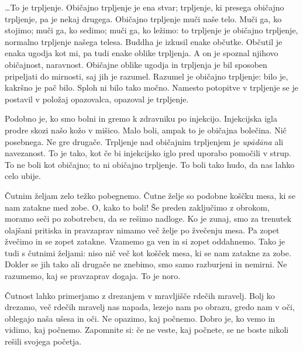 \clearpage


\ldots{}To je trpljenje. Običajno trpljenje je ena stvar; trpljenje, ki presega običajno trpljenje, pa je nekaj drugega. Običajno trpljenje muči naše telo. Muči ga, ko stojimo; muči ga, ko sedimo; muči ga, ko ležimo: to trpljenje je običajno trpljenje, normalno trpljenje našega telesa. Buddha je izkusil enake občutke. Občutil je enaka ugodja kot mi, pa tudi enake oblike trpljenja. A on je spoznal njihovo običajnost, naravnost. Običajne oblike ugodja in trpljenja je bil sposoben pripeljati do mirnosti, saj jih je razumel. Razumel je običajno trpljenje: bilo je, kakršno je pač bilo. Sploh ni bilo tako močno. Namesto potopitve v trpljenje se je postavil v položaj opazovalca, opazoval je trpljenje.

Podobno je, ko smo bolni in gremo k zdravniku po injekcijo. Injekcijska igla prodre skozi našo kožo v mišico. Malo boli, ampak to je običajna bolečina. Nič posebnega. Ne gre drugače. Trpljenje nad običajnim trpljenjem je \emph{upādāna} ali navezanost. To je tako, kot če bi injekcijsko iglo pred uporabo pomočili v strup. To ne boli kot običajno; to ni običajno trpljenje. To boli tako hudo, da nas lahko celo ubije.

\clearpage


Čutnim željam zelo težko pobegnemo. Čutne želje so podobne koščku mesa, ki se nam zatakne med zobe. O, kako to boli! Še preden zaključimo z obrokom, moramo seči po zobotrebcu, da se rešimo nadloge. Ko je zunaj, smo za trenutek olajšani pritiska in pravzaprav nimamo več želje po žvečenju mesa. Pa zopet žvečimo in se zopet zatakne. Vzamemo ga ven in si zopet oddahnemo. Tako je tudi s čutnimi željami: niso nič več kot košček mesa, ki se nam zatakne za zobe. Dokler se jih tako ali drugače ne znebimo, smo samo razburjeni in nemirni. Ne razumemo, kaj se pravzaprav dogaja. To je noro.


Čutnost lahko primerjamo z drezanjem v mravljišče rdečih mravelj. Bolj ko drezamo, več rdečih mravelj nas napada, lezejo nam po obrazu, gredo nam v oči, oblegajo naša ušesa in oči. Ne opazimo, kaj počnemo. Dobro je, ko vemo in vidimo, kaj počnemo. Zapomnite si: če ne veste, kaj počnete, se ne boste nikoli rešili svojega početja.

\clearpage

